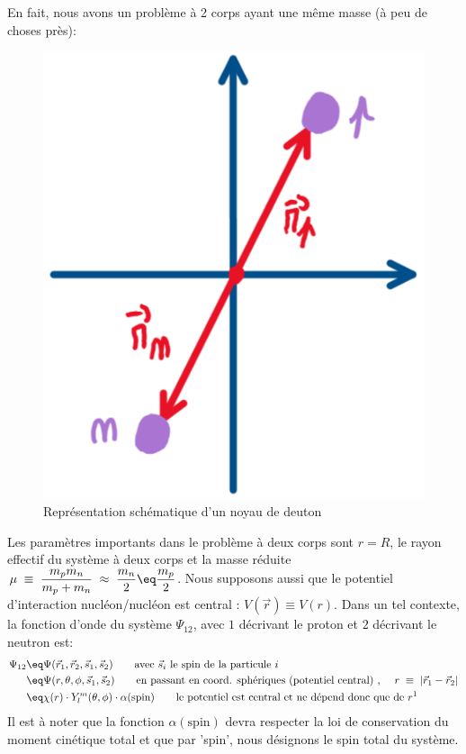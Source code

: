 En fait, nous avons un problème à 2 corps ayant une même masse (à peu de choses près):
\begin{figure}[H]
    \centering
    \includegraphics[scale=0.3]{Images4/noyau_deuton.png}
    \caption{Représentation schématique d'un noyau de deuton}
\end{figure}
Les paramètres importants dans le problème à deux corps sont $r=R$, le rayon effectif du système à deux corps et la masse réduite $\mu \;\equiv\; \dfrac{m_pm_n}{m_p+m_n} \;\approx\; \dfrac{m_n}{2} \eq \dfrac{m_p}{2}$. Nous supposons aussi que le potentiel d'interaction nucléon/nucléon est central : $V(\vec{r})\equiv V(r)$. Dans un tel contexte, la fonction d'onde du système $\Psi_{12}$, avec $1$ décrivant le proton et $2$ décrivant le neutron est:
\begin{align*}
    \Psi_{12} &\eq
    \Psi(\vec{r}_1,\vec{r}_2,\vec{s}_1,\vec{s}_2) \qquad \text{avec $\vec{s}_i$ le spin de la particule $i$}\\
    &\eq
    \Psi(r,\theta,\phi,\vec{s}_1,\vec{s}_2)   \qquad \text{en passant en coord. sphériques (potentiel central) , } \quad r \;\equiv\; |\vec{r}_1-\vec{r}_2|\\
    &\eq
    \chi(r) \cdot Y^m_l(\theta,\phi) \cdot \alpha(\text{spin}) \qquad \text{le potentiel est central et ne dépend donc que de $r$\footnotemark}
\end{align*}
Il est à noter que la fonction $\alpha(\text{spin})$ devra respecter la loi de conservation du moment cinétique total et que par 'spin', nous désignons le spin total du système.\\


